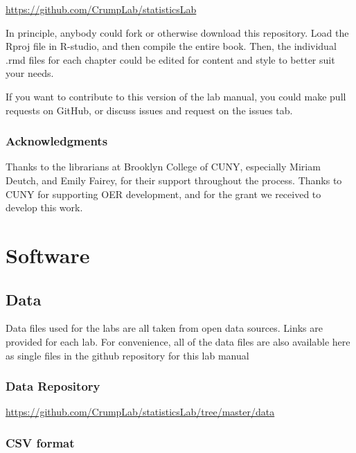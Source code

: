 \documentclass[
]{book}
\begin{document}
\url{https://github.com/CrumpLab/statisticsLab}

In principle, anybody could fork or otherwise download this repository. Load the Rproj file in R-studio, and then compile the entire book. Then, the individual .rmd files for each chapter could be edited for content and style to better suit your needs.

If you want to contribute to this version of the lab manual, you could make pull requests on GitHub, or discuss issues and request on the issues tab.

\hypertarget{acknowledgments}{%
\subsection{Acknowledgments}\label{acknowledgments}}

Thanks to the librarians at Brooklyn College of CUNY, especially Miriam Deutch, and Emily Fairey, for their support throughout the process. Thanks to CUNY for supporting OER development, and for the grant we received to develop this work.

\hypertarget{software}{%
\chapter*{Software}\label{software}}

\hypertarget{data}{%
\section{Data}\label{data}}

Data files used for the labs are all taken from open data sources. Links are provided for each lab. For convenience, all of the data files are also available here as single files in the github repository for this lab manual

\hypertarget{data-repository}{%
\subsection{Data Repository}\label{data-repository}}

\url{https://github.com/CrumpLab/statisticsLab/tree/master/data}

\hypertarget{csv-format}{%
\subsection{CSV format}\label{csv-format}}
\end{document}
